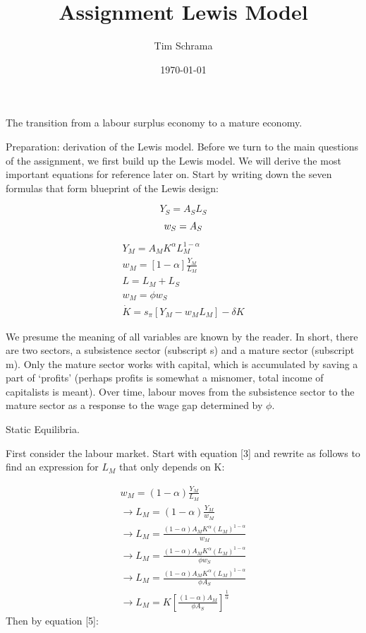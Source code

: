 \documentclass[a4paper]{article}
\title{Assignment Lewis Model}
\author{Tim Schrama}
\date{\today}
\begin{document}
\maketitle

The transition from a labour surplus economy to a mature economy.

Preparation: derivation of the Lewis model.
Before we turn to the main questions of the assignment, we first build up the Lewis model. We will derive the most important equations for reference later on. Start by writing down the seven formulas that form blueprint of the Lewis design:

\begin{equation}
Y_S=A_S L_S
\end{equation}
\begin{equation}
w_S=A_S\\
\end{equation}
\begin{align}
Y_M=A_M K^\alpha L_M ^{1-\alpha}\\
w_M=[1-\alpha]\frac{Y_M}{L_M}\\
L=L_M+L_S\\
w_M=\phi w_S\\
\dot{K}= s_\pi [Y_M-w_M L_M ]-\delta K
\end{align}

We presume the meaning of all variables are known by the reader. In short, there are two sectors, a subsistence sector (subscript s) and a mature sector (subscript m). Only the mature sector works with capital, which is accumulated by saving a part of ‘profits’ (perhaps profits is somewhat a misnomer, total income of capitalists is meant). Over time, labour moves from the subsistence sector to the mature sector as a response to the wage gap determined by $\phi$.

Static Equilibria.

First consider the labour market. Start with equation [3] and rewrite as follows to find an expression for $L_M$ that only depends on K:

\begin{align}
w_M=(1-\alpha)\frac{Y_M }{L_M}\\
\rightarrow L_M=(1-\alpha)\frac{Y_M }{w_M}\nonumber \\
\rightarrow L_M=\frac{(1-\alpha) A_M K^\alpha (L_M)^{1-\alpha} }{w_M}	\nonumber \\
\rightarrow L_M=\frac{(1-\alpha) A_M K^\alpha (L_M)^{1-\alpha} }{\phi w_S} \nonumber \\
\rightarrow L_M=\frac{(1-\alpha) A_M K^\alpha (L_M)^{1-\alpha} }{\phi A_S} \nonumber \\
\rightarrow L_M=K[\frac{(1-\alpha) A_M }{\phi A_S}]^{\frac{1}{\alpha}} \nonumber
\end{align}
Then by equation [5]:
\end{document}
